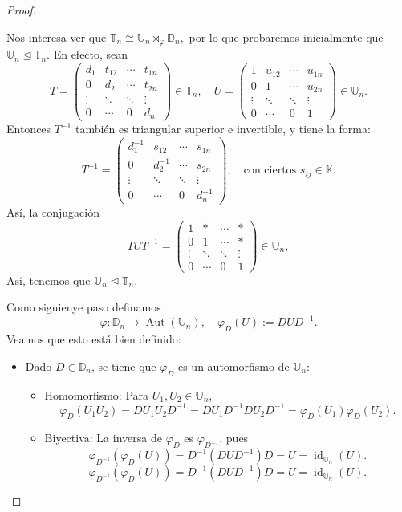 \begin{proof}
	\textcolor{white}{text}
	
	\medskip
	\noindent Nos interesa ver que  $\mathbb{T}_n \cong \mathbb{U}_n \rtimes_{\varphi} \mathbb{D}_n,$ por lo que probaremos inicialmente que $ \mathbb{U}_n \trianglelefteq \mathbb{T}_n $. En efecto, sean
\[
T =
\begin{pmatrix}
	d_1 & t_{12} & \cdots & t_{1n} \\
	0   & d_2    & \cdots & t_{2n} \\
	\vdots & \ddots & \ddots & \vdots \\
	0 & \cdots & 0 & d_n
\end{pmatrix} \in \mathbb{T}_n, \quad
U =
\begin{pmatrix}
	1 & u_{12} & \cdots & u_{1n} \\
	0 & 1 & \cdots & u_{2n} \\
	\vdots & \ddots & \ddots & \vdots \\
	0 & \cdots & 0 & 1
\end{pmatrix} \in \mathbb{U}_n.
\]
Entonces \( T^{-1} \) también es triangular superior e invertible, y tiene la forma:
\[
T^{-1} =
\begin{pmatrix}
	d_1^{-1} & s_{12} & \cdots & s_{1n} \\
	0   & d_2^{-1} & \cdots & s_{2n} \\
	\vdots & \ddots & \ddots & \vdots \\
	0 & \cdots & 0 & d_n^{-1}
\end{pmatrix},
\quad \text{con ciertos } s_{ij} \in \mathbb{K}.
\]
Así, la conjugación
\[
T U T^{-1} =
\begin{pmatrix}
	1 & * & \cdots & * \\
	0 & 1 & \cdots & * \\
	\vdots & \ddots & \ddots & \vdots \\
	0 & \cdots & 0 & 1
\end{pmatrix} \in \mathbb{U}_n,
\]
Así, tenemos que  \( \mathbb{U}_n \trianglelefteq \mathbb{T}_n \).

\medskip
\noindent Como siguienye paso definamos 
	\[
	\varphi \colon \mathbb{D}_n \to \operatorname{Aut}(\mathbb{U}_n), \quad \varphi_D(U) := D U D^{-1}.
	\]
	Veamos que esto está bien definido:
	
	\begin{itemize}
		\item Dado \( D \in \mathbb{D}_n \), se tiene que \( \varphi_D \) es un automorfismo de \( \mathbb{U}_n \):
		\begin{itemize}
			\item Homomorfismo: Para \( U_1, U_2 \in \mathbb{U}_n \),
			\[
			\varphi_D(U_1 U_2) = D U_1 U_2 D^{-1} = D U_1 D^{-1} D U_2 D^{-1} = \varphi_D(U_1) \varphi_D(U_2).
			\]
			\item Biyectiva: La inversa de \( \varphi_D \) es \( \varphi_{D^{-1}} \), pues
			\[
			\varphi_{D^{-1}}(\varphi_D(U)) = D^{-1} (D U D^{-1}) D = U=\operatorname{id}_{\mathbb{U}_n}(U).
			\]
			\[
			\varphi_{D^{-1}}(\varphi_D(U)) = D^{-1}(D U D^{-1})D = U = \operatorname{id}_{\mathbb{U}_n}(U).
			\]
			

\end{itemize}
\end{itemize}
\end{proof}
